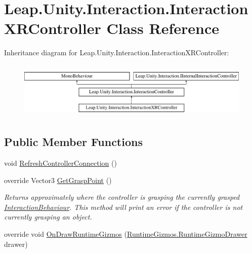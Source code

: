 \hypertarget{class_leap_1_1_unity_1_1_interaction_1_1_interaction_x_r_controller}{}\section{Leap.\+Unity.\+Interaction.\+Interaction\+X\+R\+Controller Class Reference}
\label{class_leap_1_1_unity_1_1_interaction_1_1_interaction_x_r_controller}
Inheritance diagram for Leap.\+Unity.\+Interaction.\+Interaction\+X\+R\+Controller\+:\begin{figure}[H]
\begin{center}
\leavevmode
\includegraphics[height=2.736156cm]{class_leap_1_1_unity_1_1_interaction_1_1_interaction_x_r_controller}
\end{center}
\end{figure}
\subsection*{Public Member Functions}
\begin{DoxyCompactItemize}
\item 
void \mbox{\hyperlink{class_leap_1_1_unity_1_1_interaction_1_1_interaction_x_r_controller_a84947d3cd2c236dab7849e2d805465b6}{Refresh\+Controller\+Connection}} ()
\item 
override Vector3 \mbox{\hyperlink{class_leap_1_1_unity_1_1_interaction_1_1_interaction_x_r_controller_acf5f67ce22587c6d638890d9af2ecadb}{Get\+Grasp\+Point}} ()
\begin{DoxyCompactList}\small\item\em Returns approximately where the controller is grasping the currently grasped \mbox{\hyperlink{class_leap_1_1_unity_1_1_interaction_1_1_interaction_behaviour}{Interaction\+Behaviour}}. This method will print an error if the controller is not currently grasping an object. \end{DoxyCompactList}\item 
override void \mbox{\hyperlink{class_leap_1_1_unity_1_1_interaction_1_1_interaction_x_r_controller_a3d2b1845b1041d41e2a157df230ca42b}{On\+Draw\+Runtime\+Gizmos}} (\mbox{\hyperlink{class_leap_1_1_unity_1_1_runtime_gizmos_1_1_runtime_gizmo_drawer}{Runtime\+Gizmos.\+Runtime\+Gizmo\+Drawer}} drawer)
\end{DoxyCompactItemize}
